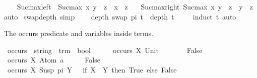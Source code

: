 \begin{isabellebody}
\isanewline
{}\isamarkupfalse%
\ \isanewline
\ \ Suc{\isacharunderscore}{\kern0pt}max{\isacharunderscore}{\kern0pt}left{\isacharcolon}{\kern0pt}\ \ {\isachardoublequoteopen}Suc{\isacharparenleft}{\kern0pt}max\ x\ y{\isacharparenright}{\kern0pt}\ {\isacharequal}{\kern0pt}\ z\ {\isasymlongrightarrow}\ x\ {\isacharless}{\kern0pt}\ z{\isachardoublequoteclose}\ \isanewline
\ \ Suc{\isacharunderscore}{\kern0pt}max{\isacharunderscore}{\kern0pt}right{\isacharcolon}{\kern0pt}\ {\isachardoublequoteopen}Suc{\isacharparenleft}{\kern0pt}max\ x\ y{\isacharparenright}{\kern0pt}\ {\isacharequal}{\kern0pt}\ z\ {\isasymlongrightarrow}\ y\ {\isacharless}{\kern0pt}\ z{\isachardoublequoteclose}\isanewline
%
\isadelimproof
%
\endisadelimproof
%
\isatagproof
{}\isamarkupfalse%
{\isacharparenleft}{\kern0pt}auto{\isacharparenright}{\kern0pt}%
\endisatagproof
{\isafoldproof}%
%
\isadelimproof
\isanewline
%
\endisadelimproof
\isanewline
{}\isamarkupfalse%
\ swap{\isacharunderscore}{\kern0pt}depth\ {\isacharbrackleft}{\kern0pt}simp{\isacharbrackright}{\kern0pt}{\isacharcolon}{\kern0pt}\ \isanewline
\ \ \ {\isachardoublequoteopen}depth\ {\isacharparenleft}{\kern0pt}swap\ pi\ t{\isacharparenright}{\kern0pt}\ {\isacharequal}{\kern0pt}\ depth\ t{\isachardoublequoteclose}\ \isanewline
%
\isadelimproof
\ \ %
\endisadelimproof
%
\isatagproof
{}\isamarkupfalse%
\ {\isacharparenleft}{\kern0pt}induct\ t{\isacharparenright}{\kern0pt}\ {\isacharparenleft}{\kern0pt}auto{\isacharparenright}{\kern0pt}%
\endisatagproof
{\isafoldproof}%
%
\isadelimproof
%
\endisadelimproof
%
\begin{isamarkuptext}%
The occurs predicate and variables inside terms.%
\end{isamarkuptext}\isamarkuptrue%
\isamarkupfalse%
\ occurs\ {\isacharcolon}{\kern0pt}{\isacharcolon}{\kern0pt}\ {\isachardoublequoteopen}string\ {\isasymRightarrow}\ trm\ {\isasymRightarrow}\ bool{\isachardoublequoteclose}\isanewline
\ \ \ \isanewline
\ \ {\isachardoublequoteopen}occurs\ X\ {\isacharparenleft}{\kern0pt}Unit{\isacharparenright}{\kern0pt}\ \ \ \ \ \ \ {\isacharequal}{\kern0pt}\ False{\isachardoublequoteclose}\isanewline
{\isacharbar}{\kern0pt}\ {\isachardoublequoteopen}occurs\ X\ {\isacharparenleft}{\kern0pt}Atom\ a{\isacharparenright}{\kern0pt}\ \ \ \ \ {\isacharequal}{\kern0pt}\ False{\isachardoublequoteclose}\isanewline
{\isacharbar}{\kern0pt}\ {\isachardoublequoteopen}occurs\ X\ {\isacharparenleft}{\kern0pt}Susp\ pi\ Y{\isacharparenright}{\kern0pt}\ \ {\isacharequal}{\kern0pt}\ {\isacharparenleft}{\kern0pt}if\ X\ {\isacharequal}{\kern0pt}\ Y\ then\ True\ else\ False{\isacharparenright}{\kern0pt}{\isachardoublequoteclose}\isanewline

\end{isabellebody}

